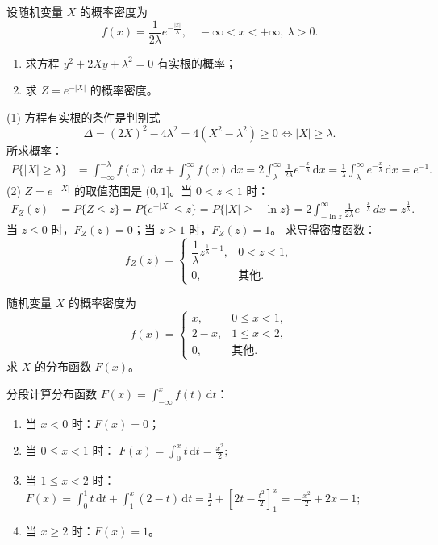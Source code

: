 \documentclass[lang=cn,11pt]{elegantbook}
\begin{document}
\begin{exercise}[拉普拉斯分布变换] 
设随机变量 $X$ 的概率密度为
\[
f(x)=\frac{1}{2\lambda}e^{-\frac{|x|}{\lambda}},\quad -\infty<x<+\infty,\ \lambda>0.
\]
\begin{enumerate}
    \item[(1)] 求方程 $y^2+2Xy+\lambda^2=0$ 有实根的概率；
    \item[(2)] 求 $Z=e^{-|X|}$ 的概率密度。
\end{enumerate}
\end{exercise}
\begin{solution}
(1) 方程有实根的条件是判别式
\[
\Delta = (2X)^2 - 4\lambda^2 = 4(X^2-\lambda^2) \geqslant 0 \Leftrightarrow |X|\geqslant\lambda.
\]
所求概率：
\[
\begin{aligned}
P\{|X|\geqslant\lambda\} &= \int_{-\infty}^{-\lambda} f(x)\,\mathrm{d}x + \int_{\lambda}^{\infty} f(x)\,\mathrm{d}x = 2\int_{\lambda}^{\infty} \frac{1}{2\lambda}e^{-\frac{x}{\lambda}}\,\mathrm{d}x = \frac{1}{\lambda}\int_{\lambda}^{\infty} e^{-\frac{x}{\lambda}}\,\mathrm{d}x = e^{-1}.
\end{aligned}
\]
(2) $Z=e^{-|X|}$ 的取值范围是 $(0,1]$。当 $0<z<1$ 时：
\[
\begin{aligned}
F_Z(z) &= P\{Z\leqslant z\} = P\{e^{-|X|}\leqslant z\} = P\{|X|\geqslant -\ln z\} = 2\int_{-\ln z}^{\infty} \frac{1}{2\lambda}e^{-\frac{x}{\lambda}}\,dx = z^{\frac{1}{\lambda}}.
\end{aligned}
\]
当 $z\leqslant0$ 时，$F_Z(z)=0$；当 $z\geqslant1$ 时，$F_Z(z)=1$。
求导得密度函数：
\[
f_Z(z) =
\begin{cases}
\dfrac{1}{\lambda}z^{\frac{1}{\lambda}-1}, & 0<z<1, \\
0, & \text{其他}.
\end{cases}
\]
\end{solution}



\begin{exercise}[分段概率密度的分布函数] \label{exer:2-47}
随机变量 $X$ 的概率密度为
\[
f(x)=
\begin{cases}
x, & 0\leqslant x<1, \\
2-x, & 1\leqslant x<2, \\
0, & \text{其他}.
\end{cases}
\]
求 $X$ 的分布函数 $F(x)$。
\end{exercise}
\begin{solution}
分段计算分布函数 $F(x) = \int_{-\infty}^{x} f(t)\,\mathrm{d}t$：
\begin{enumerate}
    \item 当 $x<0$ 时：$F(x)=0$；
    \item 当 $0\leqslant x<1$ 时：
    \(
    F(x) = \int_0^x t\,\mathrm{d}t = \frac{x^2}{2};
    \)
    \item 当 $1\leqslant x<2$ 时：
    \(
    F(x) = \int_0^1 t\,\mathrm{d}t + \int_1^x (2-t)\,\mathrm{d}t = \frac{1}{2} + \left[2t - \frac{t^2}{2}\right]_1^x = -\frac{x^2}{2} + 2x - 1;
    \)    
    \item 当 $x\geqslant2$ 时：$F(x)=1$。
\end{enumerate}
\end{solution}
\end{document}
